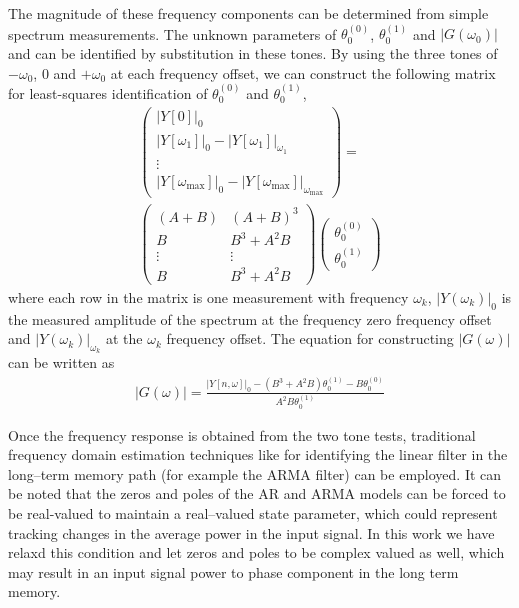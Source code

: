 \documentclass[journal]{IEEEtran}
\begin{document}
The magnitude of these frequency components can be determined from simple spectrum measurements. The unknown parameters of $\theta_0^{(0)}$, $\theta_0^{(1)}$ and $|G(\omega_0)|$ and can be identified by substitution in these tones. By using the three tones of $-\omega_0$, $0$ and $+\omega_0$ at each frequency offset, we can construct the following matrix for least-squares identification of $\theta_0^{(0)}$ and $\theta_0^{(1)}$,
\begin{align}
\nonumber \begin{pmatrix}
  |Y[0]|_0 \\
  |Y[\omega_1]|_0-|Y[\omega_1]|_{\omega_1}\\
  \vdots\\
  |Y[\omega_{\text{max}}]|_0-|Y[\omega_{\text{max}}]|_{\omega_{\text{max}}}
 \end{pmatrix} =\\
 \begin{pmatrix}
  (A+B)&(A+B)^3 \\
  B&B^3+A^2B\\
  \vdots&\vdots\\
  B&B^3+A^2B
 \end{pmatrix}
 \begin{pmatrix}
  \theta_0^{(0)} \\
  \theta_0^{(1)}
 \end{pmatrix}
\label{thetamatrixappend}
\end{align}
where each row in the matrix is one measurement with frequency $\omega_k$, $|Y(\omega_k)|_0$ is the measured amplitude of the spectrum at the frequency zero frequency offset and $|Y(\omega_k)|_{\omega_k}$ at the $\omega_k$ frequency offset. The equation for constructing $|G(\omega)|$ can be written as
\begin{align}
|G(\omega)| = \frac{|Y[n,\omega]|_0-\left(B^3+A^2B\right)\theta_0^{(1)}-B\theta_0^{(0)}}{A^2B\theta_0^{(1)}}
\label{g2eqappend}
\end{align}

Once the frequency response is obtained from the two tone tests, traditional frequency domain estimation techniques 
like \cite[p. 230]{ljung} for identifying the linear filter in the long--term memory path (for example the ARMA 
filter) can be employed. It can be noted that the zeros and poles of the AR and ARMA models can be forced to 
be real-valued to maintain a real--valued state parameter, which could represent tracking changes in the 
average power in the input signal. In this work we have relaxd this condition and let zeros and poles to be 
complex valued as well, which may result in an input signal power to phase component in the long term memory.
\end{document}
